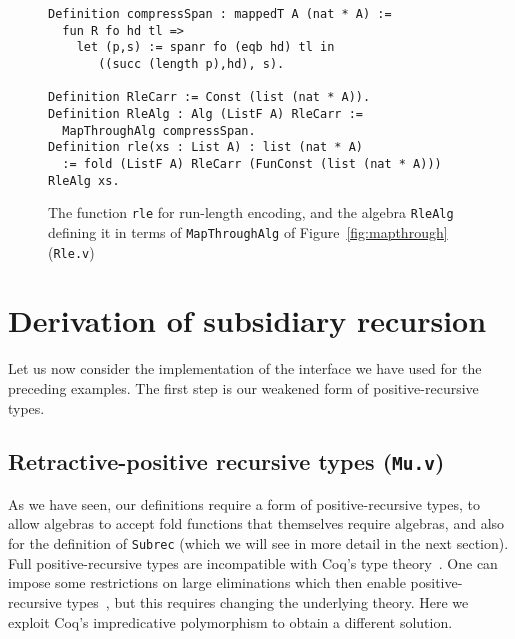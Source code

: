 \documentclass[a4paper,USenglish]{lipics-v2021}
\begin{document}
\begin{figure}
\begin{verbatim}
Definition compressSpan : mappedT A (nat * A) :=
  fun R fo hd tl => 
    let (p,s) := spanr fo (eqb hd) tl in
       ((succ (length p),hd), s).

Definition RleCarr := Const (list (nat * A)).
Definition RleAlg : Alg (ListF A) RleCarr :=
  MapThroughAlg compressSpan.
Definition rle(xs : List A) : list (nat * A)
  := fold (ListF A) RleCarr (FunConst (list (nat * A))) RleAlg xs.
\end{verbatim}
\caption{The function \texttt{rle} for run-length encoding, and the algebra \texttt{RleAlg} defining it
in terms of \texttt{MapThroughAlg} of Figure~\ref{fig:mapthrough} (\texttt{Rle.v})}
\label{fig:rle}
\end{figure}

\section{Derivation of subsidiary recursion}
\label{sec:deriv}

Let us now consider the implementation of the
interface we have used for the preceding examples.
The first step is our weakened form of positive-recursive
types.

\subsection{Retractive-positive recursive types (\texttt{Mu.v})}
\label{sec:mu}

As we have seen, our definitions require a form of positive-recursive
types, to allow algebras to accept fold functions that themselves
require algebras, and also for the definition of \verb|Subrec| (which
we will see in more detail in the next section).  Full
positive-recursive types are incompatible with Coq's type
theory~\cite{coquand88}.  One can impose some restrictions on large
eliminations which then enable positive-recursive
types~\cite{blanqui05}, but this requires changing the underlying
theory.  Here we exploit Coq's
impredicative polymorphism to obtain a different solution.
\end{document}
